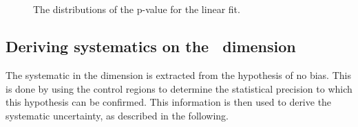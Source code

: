 \begin{figure}[h!]
  \centering
  ~~
  \\
  ~~
  \\
  \caption{\label{fig:pValues} The distributions of the p-value for the linear fit.} 
\end{figure}
\subsection{Deriving systematics on the \mht~dimension}
\label{sec:systMhtDimension}
The systematic in the \mht dimension is extracted from the hypothesis
of no bias. This is done by using the control regions 
to determine the statistical precision to which this hypothesis can
be confirmed. This information is then used to derive the systematic 
uncertainty, as described in the following. 

